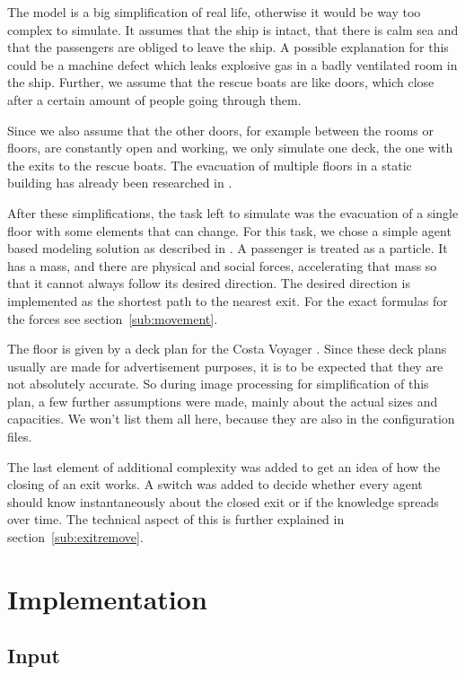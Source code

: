 \documentclass[11pt]{article}
\begin{document}
The model is a big simplification of real life, otherwise it would be way too
complex to simulate.  It assumes that the ship is intact, that there is calm
sea and that the passengers are obliged to leave the ship.  A possible
explanation for this could be a machine defect which leaks explosive gas in a
badly ventilated room in the ship.  Further, we assume that the rescue boats are
like doors, which close after a certain amount of people going through them. 

Since we also assume that the other doors, for example between the rooms or
floors, are constantly open and working, we only simulate one deck, the one
with the exits to the rescue boats.  The evacuation of multiple floors in a
static building has already been researched in \cite{multilevel}. 

After these simplifications, the task left to simulate was the evacuation of a
single floor with some elements that can change.  For this task, we chose a
simple agent based modeling solution as described in \cite{helbing}.  A
passenger is treated as a particle.  It has a mass, and there are physical and
social forces, accelerating that mass so that it cannot always follow its
desired direction.  The desired direction is implemented as the shortest path
to the nearest exit.  For the exact formulas for the forces see
section~\ref{sub:movement}.

The floor is given by a deck plan for the Costa Voyager \cite{costa}. Since
these deck plans usually are made for advertisement purposes, it is to be
expected that they are not absolutely accurate.  So during image processing for
simplification of this plan, a few further assumptions were made, mainly about
the actual sizes and capacities.  We won't list them all here, because they are
also in the configuration files. 

The last element of additional complexity was added to get an idea of how the
closing of an exit works.  A switch was added to decide whether every agent
should know instantaneously about the closed exit or if the knowledge spreads
over time.  The technical aspect of this is further explained in
section~\ref{sub:exitremove}.

\section{Implementation}

\subsection{Input}
\end{document}

